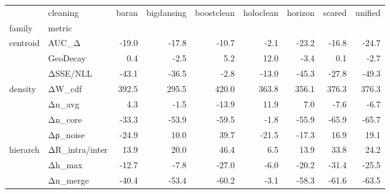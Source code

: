 \begin{tabular}{@{}llrrrrrrr@{}}
\toprule
 & cleaning & baran & bigdansing & boostclean & holoclean & horizon & scared & unified \\
family & metric &  &  &  &  &  &  &  \\
\midrule
\multirow[t]{3}{*}{centroid} & AUC_Δ & -19.0 & -17.8 & -10.7 & -2.1 & -23.2 & -16.8 & -24.7 \\
 & GeoDecay & 0.4 & -2.5 & 5.2 & 12.0 & -3.4 & 0.1 & -2.7 \\
 & ΔSSE/NLL & -43.1 & -36.5 & -2.8 & -13.0 & -45.3 & -27.8 & -49.3 \\
\cline{1-9}
\multirow[t]{4}{*}{density} & ΔW_cdf & 392.5 & 295.5 & 420.0 & 363.8 & 356.1 & 376.3 & 376.3 \\
 & Δn_avg & 4.3 & -1.5 & -13.9 & 11.9 & 7.0 & -7.6 & -6.7 \\
 & Δn_core & -33.3 & -53.9 & -59.5 & -1.8 & -55.9 & -65.9 & -65.7 \\
 & Δρ_noise & -24.9 & 10.0 & 39.7 & -21.5 & -17.3 & 16.9 & 19.1 \\
\cline{1-9}
\multirow[t]{3}{*}{hierarch} & ΔR_intra/inter & 13.9 & 20.0 & 46.4 & 6.5 & 13.9 & 33.8 & 24.2 \\
 & Δh_max & -12.7 & -7.8 & -27.0 & -6.0 & -20.2 & -31.4 & -25.5 \\
 & Δn_merge & -40.4 & -53.4 & -60.2 & -3.1 & -58.3 & -61.6 & -63.5 \\
\cline{1-9}
\bottomrule
\end{tabular}
